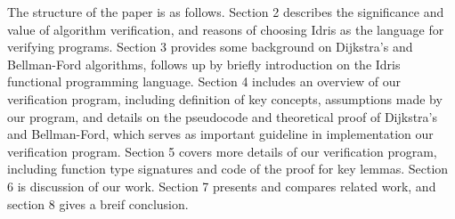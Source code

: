 The structure of the paper is as follows. Section 2 describes the significance and value of algorithm verification, and reasons of choosing Idris as the language for verifying programs. Section 3 provides some background on Dijkstra's and Bellman-Ford algorithms, follows up by briefly introduction on the Idris functional programming language. Section 4 includes an overview of our verification program, including definition of key concepts, assumptions made by our program, and details on the pseudocode and theoretical proof of Dijkstra's and Bellman-Ford, which serves as important guideline in implementation our verification program. Section 5 covers more details of our verification program, including function type signatures and code of the proof for key lemmas. Section 6 is discussion of our work. Section 7 presents and compares related work, and section 8 gives a breif conclusion.  